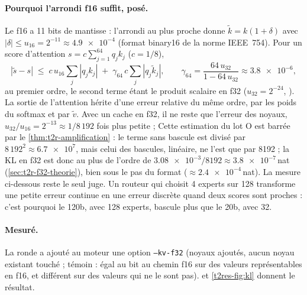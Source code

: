 \paragraph{Pourquoi l'arrondi f16 suffit, posé.} Le f16 a 11 bits de mantisse : l'arrondi au plus proche donne $\tilde k = k(1 + \delta)$ avec $|\delta| \le u_{16} = 2^{-11} \approx \num{4.9e-4}$ (format binary16 de la norme IEEE~754). Pour un score d'attention $s = c \sum_{j=1}^{64} q_j k_j$ ($c = 1/8$),
\[
|\tilde s - s| \;\le\; c\, u_{16} \sum_j |q_j k_j| \;+\; \gamma_{64}\, c \sum_j |q_j \tilde k_j|,
\qquad \gamma_{64} = \frac{64\, u_{32}}{1 - 64\, u_{32}} \approx \num{3.8e-6},
\]
au premier ordre, le second terme étant le produit scalaire en f32 ($u_{32} = 2^{-24}$, \cite{higham2002}). La sortie de l'attention hérite d'une erreur relative du même ordre, par les poids du softmax et par $\tilde v$. Avec un cache en f32, il ne reste que l'erreur des noyaux, $u_{32}/u_{16} = 2^{-13} \approx 1/8\,192$ fois plus petite ;  Cette estimation du lot O est barrée par le \cref{thm:t2r-amplification} : le terme sans bascule est divisé par $8\,192^2 \approx \num{6.7e7}$, mais celui des bascules, linéaire, ne l'est que par \num{8192} ; la KL en f32 est donc au plus de l'ordre de $\num{3.08e-3}/\num{8192} \approx \num{3.8e-7}$\,nat \calc{} (\cref{sec:t2r-f32-theorie}), bien sous le pas du format ($\approx \num{2.4e-4}$\,nat). La mesure ci-dessous reste le seul juge. Un routeur qui choisit 4 experts sur 128 transforme une petite erreur continue en une erreur discrète quand deux scores sont proches : c'est pourquoi le 120b, avec 128 experts, bascule plus que le 20b, avec 32.

\paragraph{Mesuré.} La ronde a ajouté au moteur une option \texttt{--kv-f32} (noyaux ajoutés, aucun noyau existant touché ; témoin : égal au bit au chemin f16 sur des valeurs représentables en f16, et différent sur des valeurs qui ne le sont pas).  et \cref{t2res-fig:kl} donnent le résultat.

